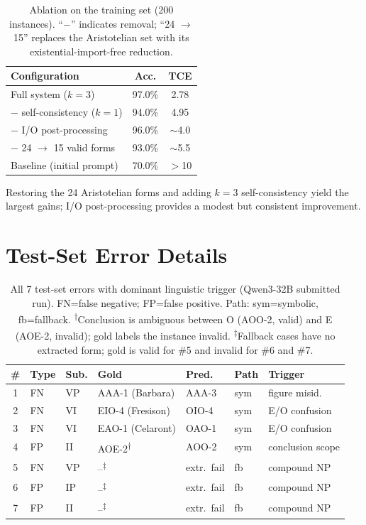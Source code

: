 \documentclass[11pt]{article}
\begin{document}
\begin{table}[h]
\centering
\small
\begin{tabular}{@{}lcc@{}}
\toprule
\textbf{Configuration} & \textbf{Acc.} & \textbf{TCE} \\
\midrule
Full system ($k=3$) & 97.0\% & 2.78 \\
\quad $-$ self-consistency ($k=1$) & 94.0\% & 4.95 \\
\quad $-$ I/O post-processing & 96.0\% & $\sim$4.0 \\
\quad $-$ 24 $\to$ 15 valid forms & 93.0\% & $\sim$5.5 \\
Baseline (initial prompt) & 70.0\% & $>$10 \\
\bottomrule
\end{tabular}
\caption{Ablation on the training set (200 instances). ``$-$'' indicates removal; ``24 $\to$ 15'' replaces the Aristotelian set with its existential-import-free reduction.}
\label{tab:ablation}
\end{table}

Restoring the 24 Aristotelian forms and adding $k=3$ self-consistency yield the largest gains; I/O post-processing provides a modest but consistent improvement.

\section{Test-Set Error Details}
\label{app:errors}

\begin{table}[h]
\centering
\scriptsize
\setlength{\tabcolsep}{3pt}
\begin{tabular}{@{}cllllll@{}}
\toprule
\textbf{\#} & \textbf{Type} & \textbf{Sub.} & \textbf{Gold} & \textbf{Pred.} & \textbf{Path} & \textbf{Trigger} \\
\midrule
1 & FN & VP & AAA-1 (Barbara)   & AAA-3        & sym & figure misid. \\
2 & FN & VI & EIO-4 (Fresison)  & OIO-4        & sym & E/O confusion \\
3 & FN & VI & EAO-1 (Celaront)  & OAO-1        & sym & E/O confusion \\
4 & FP & II & AOE-2\textsuperscript{$\dagger$} & AOO-2        & sym & conclusion scope \\
5 & FN & VP & --\textsuperscript{$\ddagger$}   & extr.\ fail  & fb  & compound NP \\
6 & FP & IP & --\textsuperscript{$\ddagger$}   & extr.\ fail  & fb  & compound NP \\
7 & FP & II & --\textsuperscript{$\ddagger$}   & extr.\ fail  & fb  & compound NP \\
\bottomrule
\end{tabular}
\caption{All 7 test-set errors with dominant linguistic trigger (Qwen3-32B submitted run). FN=false negative; FP=false positive. Path: sym=symbolic, fb=fallback. \textsuperscript{$\dagger$}Conclusion is ambiguous between O (AOO-2, valid) and E (AOE-2, invalid); gold labels the instance invalid. \textsuperscript{$\ddagger$}Fallback cases have no extracted form; gold is valid for \#5 and invalid for \#6 and \#7.}
\label{tab:error_details}
\end{table}
\end{document}
